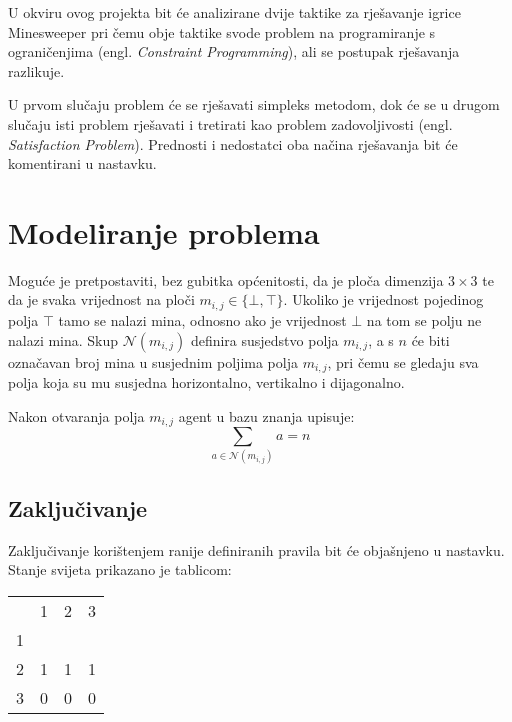 \documentclass{article}
\begin{document}
U okviru ovog projekta bit će analizirane dvije taktike za rješavanje igrice Minesweeper pri čemu obje
taktike svode problem na programiranje s ograničenjima (engl. \textit{Constraint Programming}),
ali se postupak rješavanja razlikuje.

U prvom slučaju problem će se rješavati simpleks metodom, dok će se u drugom slučaju isti
problem rješavati i tretirati kao problem zadovoljivosti (engl. \textit{Satisfaction Problem}).
Prednosti i nedostatci oba načina rješavanja bit će komentirani u nastavku.

\section{Modeliranje problema}

Moguće je pretpostaviti, bez gubitka općenitosti, da je ploča dimenzija $3 \times 3$ te da je
svaka vrijednost na ploči $m_{i, j} \in \{\bot, \top\}$. Ukoliko je vrijednost pojedinog polja
$\top$ tamo se nalazi mina, odnosno ako je vrijednost $\bot$ na tom se polju ne nalazi mina.
Skup $\mathcal{N}(m_{i, j})$ definira susjedstvo polja $m_{i, j}$, a s $n$ će biti označavan broj mina
u susjednim poljima polja $m_{i, j}$, pri čemu se gledaju sva polja koja su mu susjedna horizontalno, vertikalno i dijagonalno.

Nakon otvaranja polja $m_{i, j}$ agent u bazu znanja upisuje:
\begin{equation}
    \sum_{a \in \mathcal{N}(m_{i, j})} a = n
    \label{eq:1}
\end{equation}

\subsection{Zaključivanje}
Zaključivanje korištenjem ranije definiranih pravila bit će objašnjeno u nastavku. Stanje
svijeta prikazano je tablicom:

\begin{table}[ht]
    \centering
    \begin{tabular}{llll}
                           & 1                      & 2                      & 3                      \\ \cline{2-4}
    \multicolumn{1}{l|}{1} & \multicolumn{1}{l|}{}  & \multicolumn{1}{l|}{}  & \multicolumn{1}{l|}{}  \\ \cline{2-4}
    \multicolumn{1}{l|}{2} & \multicolumn{1}{l|}{1} & \multicolumn{1}{l|}{1} & \multicolumn{1}{l|}{1} \\ \cline{2-4}
    \multicolumn{1}{l|}{3} & \multicolumn{1}{l|}{0} & \multicolumn{1}{l|}{0} & \multicolumn{1}{l|}{0}  \\ \cline{2-4}
    \end{tabular}
\end{table}
\end{document}
